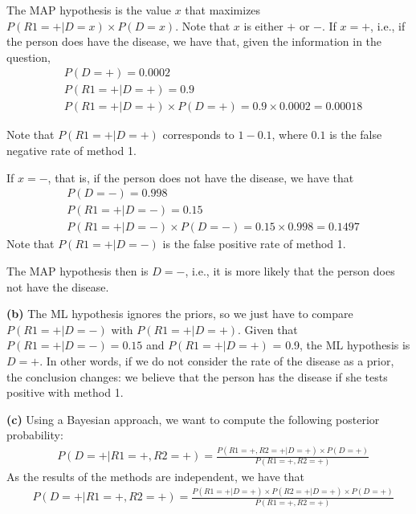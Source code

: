 \documentclass[leqno]{article}
\begin{document}
\noindent The MAP hypothesis is the value $x$ that maximizes $P(R1 = +|D = x) \times P(D = x)$.
Note that $x$ is either $+$ or $-$. If $x = +$, i.e., if the person does have the disease,
we have that, given the information in the question,
\begin{equation*}
\begin{split}  
&P(D = +) = 0.0002
\\
&P(R1 = +|D = +) = 0.9
\\
&P(R1 = +|D = +) \times P(D = +) = 0.9 \times 0.0002 = 0.00018
\end{split}  
\end{equation*}

\noindent Note that $P(R1 = +|D = +)$ corresponds to $1 - 0.1$, where $0.1$ is the false negative
rate of method 1.

\noindent If $x = -$, that is, if the person does not have the disease, we have that
\begin{equation*}
\begin{split}  
&P(D = -) = 0.998
\\
&P(R1 = +|D = -) = 0.15
\\
&P(R1 = +|D = -) \times P(D = -) = 0.15 \times 0.998 = 0.1497
\end{split}  
\end{equation*}
\noindent Note that $P(R1 = +|D = -)$ is the false positive rate of method 1.

\noindent The MAP hypothesis then is $D = -$, i.e., it is more likely that the person does
not have the disease.

\hfill

\noindent \textbf{(b)} The ML hypothesis ignores the priors, so we just have to compare
$P(R1 = +|D = -)$ with $P(R1 = +|D = +)$. Given that $P(R1 = +|D = -) = 0.15$ and
$P(R1 = +|D = +)$ = 0.9, the ML hypothesis is $D = +$. In other words, if we do not consider
the rate of the disease as a prior, the conclusion changes: we believe that the person has
the disease if she tests positive with method 1.

\hfill

\noindent \textbf{(c)} Using a Bayesian approach, we want to compute the following
posterior probability:
\begin{equation*}
\begin{split}
&P(D = +| R1 = +, R2 = +) = \frac{P(R1 = +, R2 = +| D = +) \times P(D = +)}{P(R1 = +, R2 = +)}
\end{split}  
\end{equation*}  
As the results of the methods are independent, we have that
\begin{equation}
\begin{split}
&P(D = +| R1 = +, R2 = +) = \frac{P(R1 = +|D = +) \times P(R2 = +| D = +) \times P(D = +)}{P(R1 = +, R2 = +)}
\end{split}
\label{eq2}
\end{equation}  
\end{document}

